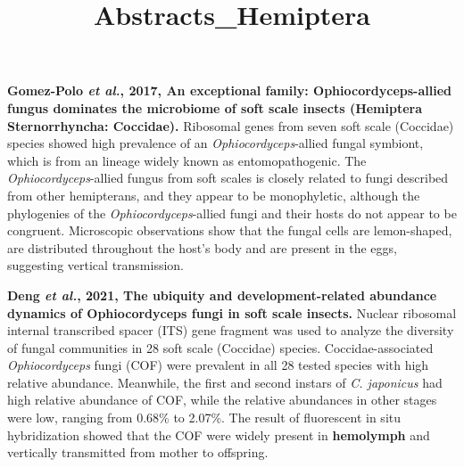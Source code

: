 \documentclass[11pt]{article}
\title{Abstracts_Hemiptera}
\author{}
\date{}
\begin{document}
\begin{sloppypar}
  \maketitle

  \linenumbers

\textbf{Gomez-Polo \textit{et al.}, 2017, An exceptional family: Ophiocordyceps-allied fungus dominates the microbiome of soft scale insects (Hemiptera Sternorrhyncha: Coccidae).} \newline
Ribosomal genes from seven soft scale (Coccidae) species showed high prevalence of an \textit{Ophiocordyceps}-allied fungal symbiont, which is from an lineage widely known as entomopathogenic. 
The \textit{Ophiocordyceps}-allied fungus from soft scales is closely related to fungi described from other hemipterans, and they appear to be monophyletic, although the phylogenies of the \textit{Ophiocordyceps}-allied fungi and their hosts do not appear to be congruent. 
Microscopic observations show that the fungal cells are lemon-shaped, are distributed throughout the host’s body and are
present in the eggs, suggesting vertical transmission.

\par

\textbf{Deng \textit{et al.}, 2021, The ubiquity and development-related abundance dynamics of Ophiocordyceps fungi in soft scale insects.} \newline
Nuclear ribosomal internal transcribed spacer (ITS) gene fragment was used to analyze the diversity of fungal communities in 28 soft scale (Coccidae) species. 
Coccidae-associated \textit{Ophiocordyceps} fungi (COF) were prevalent in all 28 tested species with high relative abundance. 
Meanwhile, the first and second instars of \textit{C. japonicus} had high relative abundance of COF, while the relative
abundances in other stages were low, ranging from 0.68\% to 2.07\%. 
The result of fluorescent in situ hybridization showed that the COF were widely present in \textbf{hemolymph} and vertically transmitted from mother to offspring. 


\end{sloppypar}
\end{document}
